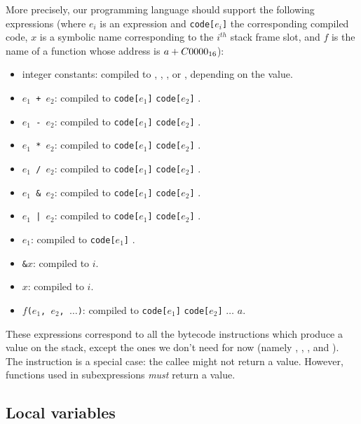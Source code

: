 More precisely, our programming language should support the following
expressions (where $e_i$ is an expression and {\tt code[$e_i$]} the
corresponding compiled code, $x$ is a symbolic name corresponding to the
$i^{th}$ stack frame slot, and $f$ is the name of a function whose address
is $a+C0000_{16}$):
\begin{itemize}
  \item integer constants: compiled to , ,
    , or , depending on the value.
  \item {\tt $e_1$ + $e_2$}: compiled to {\tt code[$e_1$]} {\tt code[$e_2$]}
    .
  \item {\tt $e_1$ - $e_2$}: compiled to {\tt code[$e_1$]} {\tt code[$e_2$]}
    .
  \item {\tt $e_1$ * $e_2$}: compiled to {\tt code[$e_1$]} {\tt code[$e_2$]}
    .
  \item {\tt $e_1$ / $e_2$}: compiled to {\tt code[$e_1$]} {\tt code[$e_2$]}
    .
  \item {\tt $e_1$ \& $e_2$}: compiled to {\tt code[$e_1$]} {\tt code[$e_2$]}
    .
  \item {\tt $e_1$ | $e_2$}: compiled to {\tt code[$e_1$]} {\tt code[$e_2$]}
    .
  \item {\tt *$e_1$}: compiled to {\tt code[$e_1$]} .
  \item {\tt \&$x$}: compiled to  $i$.
  \item {\tt $x$}: compiled to  $i$.
  \item $f${\tt($e_1$, $e_2$, $\ldots$)}: compiled to {\tt code[$e_1$]}
    {\tt code[$e_2$]} $\ldots$  $a$.
\end{itemize}

These expressions correspond to all the bytecode instructions which produce a
value on the stack, except the ones we don't need for now (namely ,
, , and ). The  instruction is a
special case: the callee might not return a value. However, functions used in
subexpressions {\em must} return a value.

\subsection{Local variables}\label{subsubsection:toyc5-local-vars}

